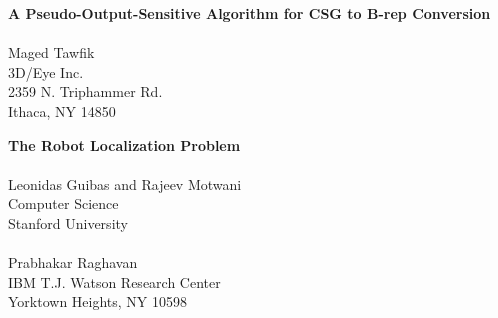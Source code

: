 \vfill
\newpage

\begin{center}
{\large\bf 
A Pseudo-Output-Sensitive Algorithm for CSG to B-rep Conversion}\\
\quad\\
Maged Tawfik\\
3D/Eye Inc.\\
2359 N. Triphammer Rd.\\
Ithaca, NY  14850
\end{center}

\begin{abstract}
CSG to {\em b}-rep conversion refers to the process of constructing
the boundary of a solid model given by a Boolean expression on a set
of primitives.  This process, also known as {\em boundary evaluation},
is a fundamental problem in the area of solid modeling.  The
presentation is limited to the 2-d case.  Therefore, a primitive is a
polygon with a given {\em b}-rep.  If $m$ denotes the number of
primitives, $n$ the total number of primitive edges, and $\alpha$ the
total number of pairwise intersections between primitive edges, an
algorithm that performs the 2-d boundary evaluation in $O(n\log n +
\alpha)$ time and $O(\alpha)$ space, is described.  The presented
algorithm is an $O(\log n)$ improvement over the best currently
available pseudo-output-sensitive algorithm.  (The exact meaning of
pseudo-output-sensitivity will be made clear in the discussion.)  This
makes the algorithm asymptotically optimal in the worst case.
Moreover, the pseudo-output-sensitivity makes it also an improvement
over the worst case optimal algorithm which costs $O(n^2)$ in both
time and space.  The algorithm is simple and, therefore, of practical
potential.
\end{abstract}

\vfill

\begin{center}
{\large\bf 
The Robot Localization Problem}\\
\quad\\
Leonidas Guibas and Rajeev Motwani\\ 
Computer Science\\
Stanford University\\
\quad\\
Prabhakar Raghavan\\
IBM T.J. Watson Research Center\\
Yorktown Heights, NY  10598
\end{center}

